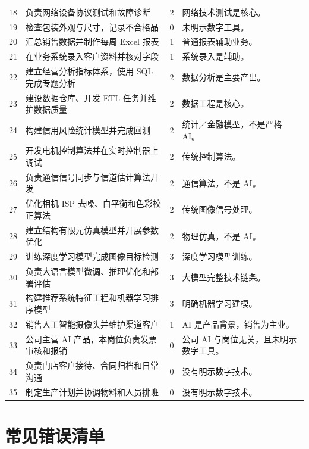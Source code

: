 \documentclass[11pt,a4paper,fontset=none]{ctexart}
\begin{document}
\begin{longtable}{C{0.7cm}L{7.3cm}C{1.1cm}L{5.2cm}}
18 & 负责网络设备协议测试和故障诊断 & 2 & 网络技术测试是核心。\\
19 & 检查包装外观与尺寸，记录不合格品 & 0 & 未明示数字工具。\\
20 & 汇总销售数据并制作每周 Excel 报表 & 1 & 普通报表辅助业务。\\
21 & 在业务系统录入客户资料并核对字段 & 1 & 系统录入是辅助。\\
22 & 建立经营分析指标体系，使用 SQL 完成专题分析 & 2 & 数据分析是主要产出。\\
23 & 建设数据仓库、开发 ETL 任务并维护数据质量 & 2 & 数据工程是核心。\\
24 & 构建信用风险统计模型并完成回测 & 2 & 统计／金融模型，不是严格 AI。\\
25 & 开发电机控制算法并在实时控制器上调试 & 2 & 传统控制算法。\\
26 & 负责通信信号同步与信道估计算法开发 & 2 & 通信算法，不是 AI。\\
27 & 优化相机 ISP 去噪、白平衡和色彩校正算法 & 2 & 传统图像信号处理。\\
28 & 建立结构有限元仿真模型并开展参数优化 & 2 & 物理仿真，不是 AI。\\
29 & 训练深度学习模型完成图像目标检测 & 3 & 深度学习模型训练。\\
30 & 负责大语言模型微调、推理优化和部署评估 & 3 & 大模型完整技术链条。\\
31 & 构建推荐系统特征工程和机器学习排序模型 & 3 & 明确机器学习建模。\\
32 & 销售人工智能摄像头并维护渠道客户 & 1 & AI 是产品背景，销售为主业。\\
33 & 公司主营 AI 产品，本岗位负责发票审核和报销 & 0 & 公司 AI 与岗位无关，且未明示数字工具。\\
34 & 负责门店客户接待、合同归档和日常沟通 & 0 & 没有明示数字技术。\\
35 & 制定生产计划并协调物料和人员排班 & 0 & 没有明示数字技术。\\
\bottomrule
\end{longtable}
\normalsize

\section{常见错误清单}
\end{document}
